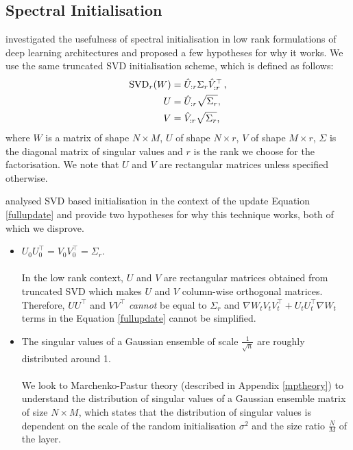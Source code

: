 \documentclass{article}
\begin{document}
\subsection{Spectral Initialisation}
 \cite{khodak2021initialization} investigated the usefulness of spectral initialisation in low rank formulations of deep learning architectures and proposed a few hypotheses for why it works. We use the same truncated SVD initialisation scheme, which is defined as follows:
\begin{align}
\text{SVD}_r(W) &= \hat{U}_{:r} \Sigma_r \hat{V}^\top_{:r} \hspace{0.5mm}\text{,} \label{eqn:svd} \\
U &= \hat{U}_{:r} \sqrt{\Sigma_r}\text{,} \nonumber \\
V &= \hat{V}_{:r} \sqrt{\Sigma_r}\text{,} \nonumber
\end{align}
where $W$ is a matrix of shape $N \times M$, $U$ of shape $N \times r$, $V$ of shape $M \times r$, \(\Sigma\) is the diagonal matrix of singular values and $r$ is the rank we choose for the factorisation. We note that $U$ and $V$ are rectangular matrices unless specified otherwise.

\cite{khodak2021initialization} analysed SVD based initialisation in the context of the update Equation \ref{fullupdate} and provide two hypotheses for why this technique works, both of which we disprove. 

\begin{itemize}
    \item $U_0 U_0^\top = V_0 V_0^\top = \Sigma_r$. \\ \\
In the low rank context, $U$ and $V$ are rectangular matrices obtained from truncated SVD which makes $U$ and $V$ column-wise orthogonal matrices. Therefore, $UU^\top$ and $VV^\top$ \emph{cannot} be equal to $\Sigma_{r}$ and $\nabla W_t V_t V_t^\top + U_t U_t^\top \nabla W_t$ terms in the Equation \ref{fullupdate} cannot be simplified.
    \item The singular values of a Gaussian ensemble of scale $\frac{1}{\sqrt{n}}$ are roughly distributed around 1. \\ \\
We look to Marchenko-Pastur theory (described in Appendix \ref{mptheory}) to understand the distribution of singular values of a Gaussian ensemble matrix of size $N \times M$, which states that the distribution of singular values is dependent on the scale of the random initialisation $\sigma^2$ and the size ratio $\frac{N}{M}$ of the layer.
\end{itemize}
\end{document}
